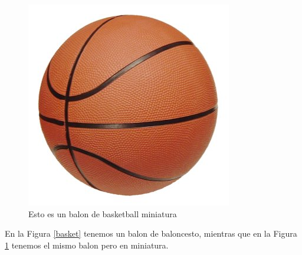\begin{figure}[h]
    \begin{flushright}
        \includegraphics[scale=0.1]{imgs/basket/pelota.jpeg}
        \caption{Esto es un balon de basketball miniatura}
        \label{minibasket}
    \end{flushright}
\end{figure}

En la Figura \ref{basket} tenemos un balon de baloncesto, mientras que en la Figura \ref{minibasket} tenemos el mismo balon pero en miniatura.
